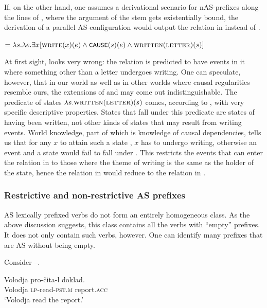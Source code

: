 \documentclass[output=paper,colorlinks,citecolor=brown]{langscibook}
\begin{document}
If, on the other hand, one assumes a derivational scenario for nAS-prefixes along the lines of , where the argument of the stem gets existentially bound, the derivation of a parallel AS-configuration would output the relation in  instead of .

\ea   {} $= \lambda s.\lambda e.\exists x [\textsc{write}(x)(e) \wedge \cnst{cause}(s)(e) \wedge \textsc{written}(\textsc{letter})(s)]$\label{ex:tatevosov:96}
\z

\noindent At first sight,  looks very wrong: the relation is predicted to have events in it where something other than a letter undergoes writing. One can speculate, however, that in our world as well as in other worlds where causal regularities resemble ours, the extensions of  and  may come out indistinguishable. The predicate of states $\lambda s.\textsc{written}(\textsc{letter})(s)$ comes, according to , with very specific descriptive properties. States that fall under this predicate %
are states of having been written, not other kinds of states that may result from writing events. World knowledge, part of which is knowledge of causal dependencies, tells us that for any $x$ to attain such a state%
, $x$ has to undergo writing, otherwise an event and a state would fail to fall under . This restricts the events that can enter the relation in  to those where the theme of writing is the same as the holder of the state, hence the relation in  would reduce to the relation in .

\subsubsection{Restrictive and non-restrictive AS prefixes}\label{sec:3.3.4}
\hypertarget{RefHeadingToc164647631}{}
AS lexically prefixed verbs do not form an entirely homogeneous class. As the above discussion suggests, this class contains all the verbs with “empty” prefixes. It does not only contain such verbs, however. One can identify many prefixes that are AS without being empty. 

Consider --.

\ea\label{ex:tatevosov:97}
\gll Volodja  pro-čita-l   doklad.\\
  Volodja  \textsc{lp}-read-\textsc{pst.m}  report.\textsc{acc}\\
\glt ‘Volodja read the report.’
\z
\end{document}
